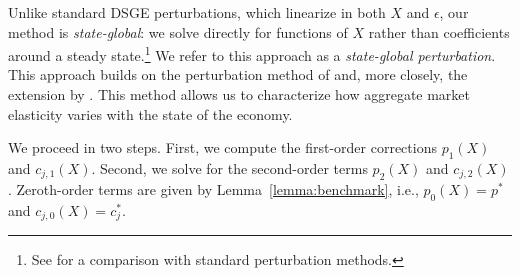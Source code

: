 Unlike standard DSGE perturbations, which linearize in both $X$ and $\epsilon$, our method is \emph{state-global}: we solve directly for functions of $X$ rather than coefficients around a steady state.\footnote{See \citet{kargar2020competitive} for a comparison with standard perturbation methods.} 
We refer to this approach as a \emph{state-global perturbation}. 
This approach builds on the perturbation method of \citet{kogan2001risk} and, more closely, the extension 
by \citet{Silva/riskchannel}.
This method allows us to characterize how aggregate market elasticity varies with the state of the economy.

We proceed in two steps. First, we compute the first-order corrections $p_1(X)$ and $c_{j,1}(X)$. Second, we solve for the second-order terms $p_2(X)$ and $c_{j,2}(X)$. Zeroth-order terms are given by Lemma~\ref{lemma:benchmark}, i.e., $p_0(X)=p^*$ and $c_{j,0}(X)=c_j^*$.






